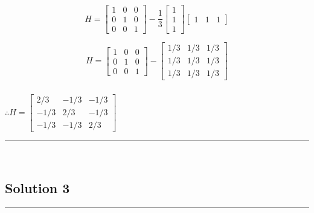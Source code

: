 \documentclass{article}
\begin{document}
$$ H = \begin{bmatrix} 1 & 0 & 0 \\ 0 & 1 & 0 \\ 0 & 0 & 1 \end{bmatrix} - \frac{1}{3}\begin{bmatrix} 1 \\ 1 \\ 1 \end{bmatrix}\begin{bmatrix} 1 & 1 & 1 \end{bmatrix} $$

$$ H = \begin{bmatrix} 1 & 0 & 0 \\ 0 & 1 & 0 \\ 0 & 0 & 1 \end{bmatrix} - \begin{bmatrix} 1/3 & 1/3 & 1/3 \\ 1/3 & 1/3 & 1/3 \\ 1/3 & 1/3 & 1/3 \end{bmatrix} $$

\subsubsection*{\normalfont}{$\therefore H = \begin{bmatrix} 2/3 & -1/3 & -1/3 \\ -1/3 & 2/3 & -1/3 \\ -1/3 & -1/3 & 2/3 \end{bmatrix}$}

\noindent\rule{\textwidth}{0.4pt}\\

\newpage

\subsection*{Solution 3}
\noindent\rule{\textwidth}{0.4pt}\\
\end{document}
